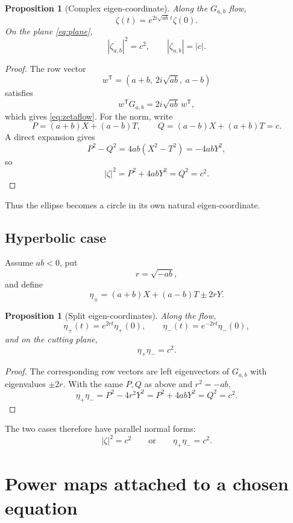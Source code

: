\documentclass[11pt]{amsart}
\newtheorem{proposition}[theorem]{Proposition}
\theoremstyle{remark}
\begin{document}
\begin{proposition}[Complex eigen-coordinate]\label{prop:zeta}
Along the $G_{a,b}$ flow,
\begin{equation}\label{eq:zetaflow}
\zeta(t)=e^{2i\sqrt{ab}\,t}\zeta(0).
\end{equation}
On the plane \eqref{eq:plane},
\begin{equation}\label{eq:zetanorm}
\boxed{|\zeta_{a,b}|^2=c^2,\qquad |\zeta_{a,b}|=|c|.}
\end{equation}
\end{proposition}

\begin{proof}
The row vector
\[
w^{\mathsf T}=(a+b,\ 2i\sqrt{ab},\ a-b)
\]
satisfies
\[
w^{\mathsf T}G_{a,b}=2i\sqrt{ab}\,w^{\mathsf T},
\]
which gives \eqref{eq:zetaflow}.  For the norm, write
\[
P=(a+b)X+(a-b)T,
\qquad
Q=(a-b)X+(a+b)T=c.
\]
A direct expansion gives
\[
P^2-Q^2
=4ab(X^2-T^2)
=-4abY^2,
\]
so
\[
|\zeta|^2=P^2+4abY^2=Q^2=c^2.
\]
\end{proof}

Thus the ellipse becomes a circle in its own natural eigen-coordinate.

\subsection{Hyperbolic case}
Assume $ab<0$, put
\[
r=\sqrt{-ab},
\]
and define
\begin{equation}\label{eq:etas}
\eta_\pm=(a+b)X+(a-b)T\pm2rY.
\end{equation}

\begin{proposition}[Split eigen-coordinates]\label{prop:eta}
Along the flow,
\[
\eta_+(t)=e^{2rt}\eta_+(0),
\qquad
\eta_-(t)=e^{-2rt}\eta_-(0),
\]
and on the cutting plane,
\begin{equation}\label{eq:etaproduct}
\boxed{\eta_+\eta_-=c^2.}
\end{equation}
\end{proposition}

\begin{proof}
The corresponding row vectors are left eigenvectors of $G_{a,b}$ with eigenvalues $\pm2r$.  With the same $P,Q$ as above and $r^2=-ab$,
\[
\eta_+\eta_-=P^2-4r^2Y^2
=P^2+4abY^2
=Q^2=c^2.
\]
\end{proof}

The two cases therefore have parallel normal forms:
\[
|\zeta|^2=c^2
\qquad\text{or}\qquad
\eta_+\eta_-=c^2.
\]

\section{Power maps attached to a chosen equation}
\end{document}
